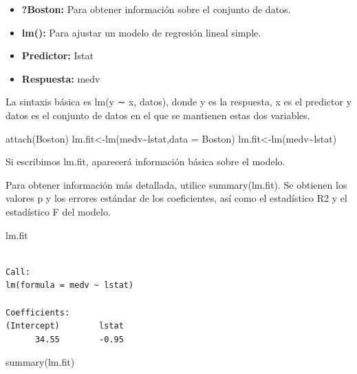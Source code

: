 \documentclass[
  letterpaper,
  DIV=11,
  numbers=noendperiod]{scrartcl}
\newenvironment{Shaded}{\begin{snugshade}}{\end{snugshade}}
\newcommand{\AttributeTok}[1]{\textcolor[rgb]{0.40,0.45,0.13}{#1}}
\newcommand{\FunctionTok}[1]{\textcolor[rgb]{0.28,0.35,0.67}{#1}}
\newcommand{\NormalTok}[1]{\textcolor[rgb]{0.00,0.23,0.31}{#1}}
\newcommand{\OtherTok}[1]{\textcolor[rgb]{0.00,0.23,0.31}{#1}}
\newcommand{\SpecialCharTok}[1]{\textcolor[rgb]{0.37,0.37,0.37}{#1}}
\begin{document}
\begin{itemize}
\item
  \textbf{?Boston:} Para obtener información sobre el conjunto de datos.
\item
  \textbf{lm():} Para ajustar un modelo de regresión lineal simple.
\item
  \textbf{Predictor:} Istat
\item
  \textbf{Respuesta:} medv
\end{itemize}

La sintaxis básica es lm(y ∼ x, datos), donde y es la respuesta, x es el
predictor y datos es el conjunto de datos en el que se mantienen estas
dos variables.

\begin{Shaded}
\begin{Highlighting}[]
\FunctionTok{attach}\NormalTok{(Boston)}
\NormalTok{lm.fit}\OtherTok{\textless{}{-}}\FunctionTok{lm}\NormalTok{(medv}\SpecialCharTok{\textasciitilde{}}\NormalTok{lstat,}\AttributeTok{data =}\NormalTok{ Boston)}
\NormalTok{lm.fit}\OtherTok{\textless{}{-}}\FunctionTok{lm}\NormalTok{(medv}\SpecialCharTok{\textasciitilde{}}\NormalTok{lstat)}
\end{Highlighting}
\end{Shaded}

Si escribimos lm.fit, aparecerá información básica sobre el modelo.

Para obtener información más detallada, utilice summary(lm.fit). Se
obtienen los valores p y los errores estándar de los coeficientes, así
como el estadístico R2 y el estadístico F del modelo.

\begin{Shaded}
\begin{Highlighting}[]
\NormalTok{lm.fit}
\end{Highlighting}
\end{Shaded}

\begin{verbatim}

Call:
lm(formula = medv ~ lstat)

Coefficients:
(Intercept)        lstat  
      34.55        -0.95  
\end{verbatim}

\begin{Shaded}
\begin{Highlighting}[]
\FunctionTok{summary}\NormalTok{(lm.fit)}
\end{Highlighting}
\end{Shaded}
\end{document}
